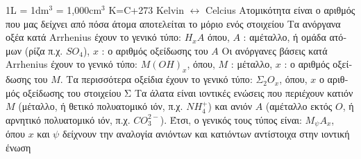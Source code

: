 \documentclass[12pt]{article}
\begin{document}
\begin{flushleft}
	\textbullet \quad 1L = 1dm$^3$ = 1,000cm$^3$ \linebreak 
	\textbullet \quad K=C+273 Kelvin $\leftrightarrow$ Celcius 
	\textbullet \quad \textgreek{Ατομικότητα είναι ο αριθμός που μας δείχνει από πόσα άτομα αποτελείται το μόριο ενός στοιχείου} \linebreak 
	\textbullet \quad \textgreek{Τα ανόργανα οξέα κατά} Arrhenius \textgreek{έχουν το γενικό τύπο}: $H_xA$ \textgreek{όπου}, $A$  :  \textgreek{αμέταλλο, ή ομάδα ατόμων (ρίζα π.χ.} $SO_4$), $x$  :  \textgreek{ο αριθμός οξείδωσης του} $A$ \linebreak 
	\textbullet \quad \textgreek{Οι ανόργανες βάσεις κατά} Arrhenius \textgreek{έχουν το γενικό τύπο}: $M(OH)_x$, \textgreek{όπου}, $M$  :  \textgreek{μέταλλο}, $x$  :  \textgreek{ο αριθμός οξείδωσης του} $M$. \linebreak 
	\textbullet \quad \textgreek{Τα περισσότερα οξείδια έχουν το γενικό τύπο}: $\Sigma_2O_x$, \textgreek{όπου}, $x$ \textgreek{ο αριθμός οξείδωσης του στοιχείου Σ} \linebreak 
	\textbullet \quad \textgreek{Τα άλατα είναι ιοντικές ενώσεις που περιέχουν κατιόν} $M$ (\textgreek{μέταλλο, ή θετικό πολυατομικό ιόν, π.χ.} $NH_4^+$) \textgreek{και ανιόν} $A$ (\textgreek{αμέταλλο εκτός} $O$, \textgreek{ή αρνητικό πολυατομικό ιόν, π.χ.} $CO_3^{2-}$). \textgreek{Έτσι, ο γενικός τους τύπος είναι:} $M_\psi A_x$, \textgreek{όπου} $x$ \textgreek{και} $\psi$ \textgreek{δείχνουν την αναλογία ανιόντων και κατιόντων αντίστοιχα στην ιοντική ένωση} \linebreak 
	

\end{flushleft}
\end{document}
